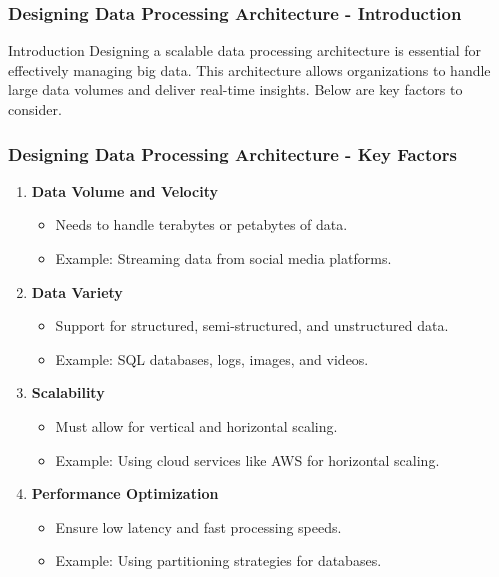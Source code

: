 \documentclass[aspectratio=169]{beamer}
\begin{document}
\begin{frame}[fragile]
    \frametitle{Designing Data Processing Architecture - Introduction}
    \begin{block}{Introduction}
        Designing a scalable data processing architecture is essential for effectively managing big data. This architecture allows organizations to handle large data volumes and deliver real-time insights. Below are key factors to consider.
    \end{block}
\end{frame}

\begin{frame}[fragile]
    \frametitle{Designing Data Processing Architecture - Key Factors}
    \begin{enumerate}
        \item \textbf{Data Volume and Velocity}
          \begin{itemize}
              \item Needs to handle terabytes or petabytes of data.
              \item Example: Streaming data from social media platforms.
          \end{itemize}
          
        \item \textbf{Data Variety}
          \begin{itemize}
              \item Support for structured, semi-structured, and unstructured data.
              \item Example: SQL databases, logs, images, and videos.
          \end{itemize}
          
        \item \textbf{Scalability}
          \begin{itemize}
              \item Must allow for vertical and horizontal scaling.
              \item Example: Using cloud services like AWS for horizontal scaling.
          \end{itemize}
          
        \item \textbf{Performance Optimization}
          \begin{itemize}
              \item Ensure low latency and fast processing speeds.
              \item Example: Using partitioning strategies for databases.
          \end{itemize}
    \end{enumerate}
\end{frame}
\end{document}
